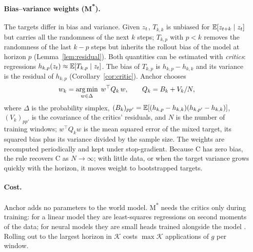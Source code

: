 \paragraph{Bias--variance weights (M\textsuperscript{*}).}
The targets differ in bias and variance. Given $z_{t}$, $T_{k,k}$ is unbiased for $\mathbb{E}[z_{t+k} \mid z_{t}]$ but carries all the randomness of the next $k$ steps; $T_{k,p}$ with $p < k$ removes the randomness of the last $k - p$ steps but inherits the rollout bias of the model at horizon $p$ (Lemma~\ref{lem:residual}). Both quantities can be estimated with \emph{critics}: regressions $h_{k,p}(z_{t}) \approx \mathbb{E}[T_{k,p} \mid z_{t}]$. The bias of $T_{k,p}$ is $h_{k,p} - h_{k,k}$ and its variance is the residual of $h_{k,p}$ (Corollary~\ref{cor:critic}). Anchor chooses
\begin{equation}
  w_{k} = \operatorname*{arg\,min}_{w \in \Delta} \; w^\top Q_k \, w, \qquad Q_k = B_k + V_k / N,
  \label{eq:weights}
\end{equation}
where $\Delta$ is the probability simplex, $(B_k)_{pp'} = \mathbb{E}[(h_{k,p} - h_{k,k})(h_{k,p'} - h_{k,k})]$, $(V_k)_{pp'}$ is the covariance of the critics' residuals, and $N$ is the number of training windows; $w^\top Q_k w$ is the mean squared error of the mixed target, its squared bias plus its variance divided by the sample size. The weights are recomputed periodically and kept under stop-gradient. Because C has zero bias, the rule recovers C as $N \to \infty$; with little data, or when the target variance grows quickly with the horizon, it moves weight to bootstrapped targets.

\paragraph{Cost.}
Anchor adds no parameters to the world model. M\textsuperscript{*} needs the critics only during training: for a linear model they are least-squares regressions on second moments of the data; for neural models they are small heads trained alongside the model . Rolling out to the largest horizon in $\mathcal K$ costs $\max \mathcal K$ applications of $g$ per window.
